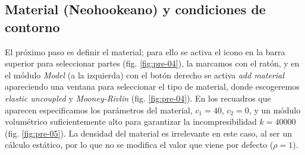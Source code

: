 \subsection{Material (Neohookeano) y condiciones de contorno}

El próximo paso es definir el material; para ello se activa el icono en la barra superior para seleccionar partes (fig. \ref{fig:pre-04}), la marcamos con el ratón, y en el módulo \emph{Model} (a la izquierda) con el botón derecho se activa \emph{add material} apareciendo una ventana para seleccionar el tipo de material, donde escogeremos \emph{elastic uncoupled} y \emph{Mooney-Rivlin} (fig. \ref{fig:pre-04}).
En los recuadros que aparecen especificamos los parámetros del material, $c_{1}=40$, $c_{2}=0$, y un módulo volumétrico suficientemente alto para garantizar la incompresibilidad $k=40000$ (fig. \ref{fig:pre-05}).
La densidad del material es irrelevante en este caso, al ser un cálculo estático, por lo que no se modifica el valor que viene por defecto ($\rho=1$).
